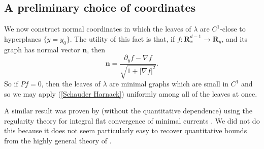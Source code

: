 \documentclass[reqno,11pt]{amsart}
\newcommand{\RR}{\mathbf{R}}
\newcommand{\normal}{\mathbf n}
\theoremstyle{definition}
\numberwithin{equation}{section}
\begin{document}
\subsection{A preliminary choice of coordinates}
We now construct normal coordinates in which the leaves of $\lambda$ are $C^1$-close to hyperplanes $\{y = y_0\}$.
The utility of this fact is that, if $f: \RR^{d - 1}_x \to \RR_y$, and its graph has normal vector $\normal$, then
\begin{equation}\label{nabla as a normal}
	\normal = \frac{\partial_y f - \nabla f}{\sqrt{1 + |\nabla f|^2}}.
\end{equation}
So if $Pf = 0$, then the leaves of $\lambda$ are minimal graphs which are small in $C^1$ and so we may apply (\ref{Schauder Harnack}) uniformly among all of the leaves at once.

A similar result was proven by \cite{Solomon86} (without the quantitative dependence) using the regularity theory for integral flat convergence of minimal currents \cite[Theorem 5.3.14]{federer2014geometric}.
We did not do this because it does not seem particularly easy to recover quantitative bounds from the highly general theory of \cite[Chapter 5]{federer2014geometric}.
\end{document}
